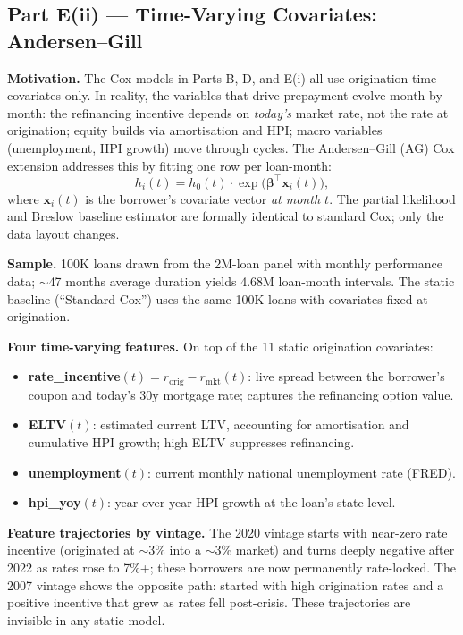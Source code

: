 \documentclass[11pt,a4paper]{article}
\begin{document}
\subsection{Part E(ii) --- Time-Varying Covariates: Andersen--Gill}

\textbf{Motivation.} The Cox models in Parts B, D, and E(i) all use origination-time covariates only. In reality, the variables that drive prepayment evolve month by month: the refinancing incentive depends on \emph{today's} market rate, not the rate at origination; equity builds via amortisation and HPI; macro variables (unemployment, HPI growth) move through cycles. The Andersen--Gill (AG) Cox extension addresses this by fitting one row per loan-month:
\[
  h_i(t) = h_0(t) \cdot \exp\!\bigl(\boldsymbol{\beta}^\top \mathbf{x}_i(t)\bigr),
\]
where $\mathbf{x}_i(t)$ is the borrower's covariate vector \emph{at month $t$}. The partial likelihood and Breslow baseline estimator are formally identical to standard Cox; only the data layout changes.

\textbf{Sample.} 100K loans drawn from the 2M-loan panel with monthly performance data; $\sim$47 months average duration yields 4.68M loan-month intervals. The static baseline (``Standard Cox'') uses the same 100K loans with covariates fixed at origination.

\textbf{Four time-varying features.} On top of the 11 static origination covariates:
\begin{itemize}[leftmargin=1.2em,itemsep=2pt,topsep=2pt]
  \item \textbf{rate\_incentive}$(t) = r_{\text{orig}} - r_{\text{mkt}}(t)$: live spread between the borrower's coupon and today's 30y mortgage rate; captures the refinancing option value.
  \item \textbf{ELTV}$(t)$: estimated current LTV, accounting for amortisation and cumulative HPI growth; high ELTV suppresses refinancing.
  \item \textbf{unemployment}$(t)$: current monthly national unemployment rate (FRED).
  \item \textbf{hpi\_yoy}$(t)$: year-over-year HPI growth at the loan's state level.
\end{itemize}

\textbf{Feature trajectories by vintage.} The 2020 vintage starts with near-zero rate incentive (originated at $\sim$3\% into a $\sim$3\% market) and turns deeply negative after 2022 as rates rose to 7\%+; these borrowers are now permanently rate-locked. The 2007 vintage shows the opposite path: started with high origination rates and a positive incentive that grew as rates fell post-crisis. These trajectories are invisible in any static model.
\end{document}
